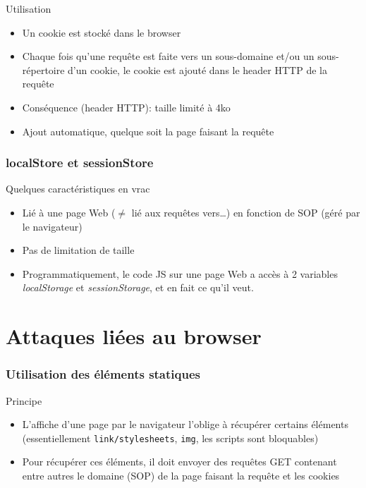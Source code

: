 \begin{reveals}
\begin{frame}
  \begin{block}{Utilisation}
    \begin{itemize}
    \item Un cookie est stock\'e dans le browser
    \item Chaque fois qu'une requ\^ete est faite vers un sous-domaine
      et/ou un sous-r\'epertoire d'un cookie, le cookie est ajout\'e dans
      le header HTTP de la requ\^ete
    \item Cons\'equence (header HTTP): taille limit\'e \`a 4ko
    \item Ajout automatique, quelque soit la page faisant la requ\^ete
    \end{itemize}
  \end{block}

\end{frame}

\begin{frame}
  \frametitle{localStore et sessionStore}

  \begin{block}{Quelques caract\'eristiques en vrac}
    \begin{itemize}
    \item Li\'e \`a une page Web ($\neq$ li\'e aux requ\^etes vers\ldots{}) en
      fonction de SOP (g\'er\'e par le navigateur)
    \item Pas de limitation de taille
    \item Programmatiquement, le code JS sur une page Web a acc\`e{}s \`a 2
      variables \emph{localStorage} et \emph{sessionStorage}, et en
      fait ce qu'il veut.
    \end{itemize}
  \end{block}
\end{frame}

\section{Attaques li{\'e}es au browser}

\begin{frame}
  \frametitle{Utilisation des \'el\'ements statiques}
  
  \begin{block}{Principe}
    \begin{itemize}
    \item L'affiche d'une page par le navigateur l'oblige \`a
      r\'ecup\'erer certains \'el\'ements (essentiellement
      \texttt{link/stylesheets}, \texttt{img}, les scripts sont
      bloquables)
    \item Pour r\'ecup\'erer ces \'el\'ements, il doit envoyer des
      requ\^etes GET contenant entre autres le domaine (SOP) de la
      page faisant la requ\^ete et les cookies
    \end{itemize}
  \end{block}


\end{frame}
\end{reveals}
